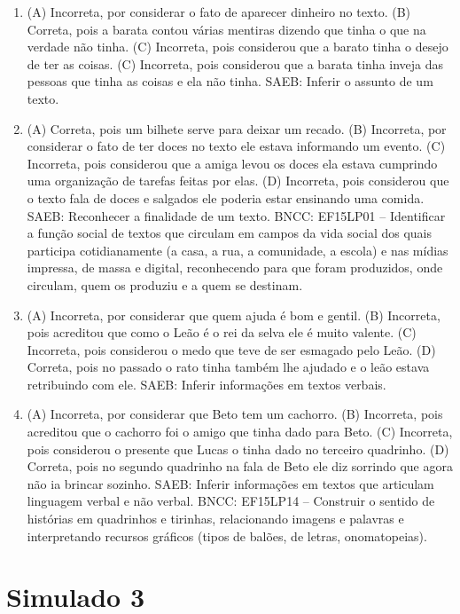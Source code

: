 \begin{enumerate}
\item
(A) Incorreta, por considerar o fato de aparecer dinheiro no texto.
(B) Correta, pois a barata contou várias mentiras dizendo que tinha o
que na verdade não tinha.
(C) Incorreta, pois considerou que a barato tinha o desejo de ter as
coisas.
(C) Incorreta, pois considerou que a barata tinha inveja das pessoas que
tinha as coisas e ela não tinha.
SAEB: Inferir o assunto de um texto.

\item
(A) Correta, pois um bilhete serve para deixar um recado.
(B) Incorreta, por considerar o fato de ter doces no texto ele estava
informando um evento.
(C) Incorreta, pois considerou que a amiga levou os doces ela estava
cumprindo uma organização de tarefas feitas por elas.
(D) Incorreta, pois considerou que o texto fala de doces e salgados ele
poderia estar ensinando uma
comida.
SAEB: Reconhecer a finalidade de um texto.
BNCC: EF15LP01 -- Identificar a função social de textos que
circulam em campos da vida social dos quais participa cotidianamente (a
casa, a rua, a comunidade, a escola) e nas mídias impressa, de massa e
digital, reconhecendo para que foram produzidos, onde circulam, quem os
produziu e a quem se destinam.

\item
(A) Incorreta, por considerar que quem ajuda é bom e gentil.
(B) Incorreta, pois acreditou que como o Leão é o rei da selva ele é
muito valente.
(C) Incorreta, pois considerou o medo que teve de ser esmagado pelo
Leão.
(D) Correta, pois no passado o rato tinha também lhe ajudado e o leão
estava retribuindo com ele.
SAEB: Inferir informações em textos verbais.

\item
(A) Incorreta, por considerar que Beto tem um cachorro.
(B) Incorreta, pois acreditou que o cachorro foi o amigo que tinha dado
para Beto.
(C) Incorreta, pois considerou o presente que Lucas o tinha dado no
terceiro quadrinho.
(D) Correta, pois no segundo quadrinho na fala de Beto ele diz sorrindo
que agora não ia brincar sozinho.
SAEB: Inferir informações em textos que articulam linguagem
verbal e não verbal.
BNCC: EF15LP14 -- Construir o sentido de histórias em
quadrinhos e tirinhas, relacionando imagens e palavras e interpretando
recursos gráficos (tipos de balões, de letras, onomatopeias).
\end{enumerate}

\section*{Simulado 3}

